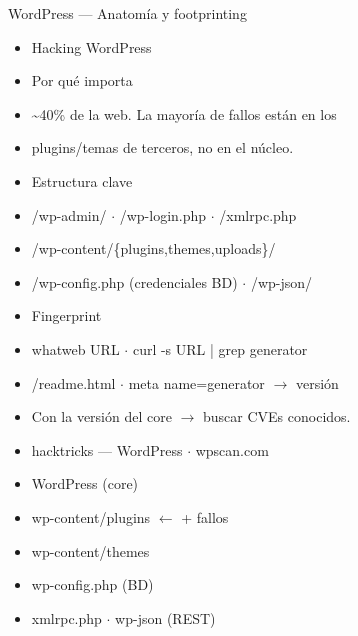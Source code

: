\documentclass[aspectratio=169,10pt]{beamer}
\begin{document}
\begin{frame}[allowframebreaks]{WordPress --- Anatomía y footprinting}
\small
  \begin{itemize}
  \item Hacking WordPress
  \item Por qué importa
  \item \textasciitilde{}40\% de la web. La mayoría de fallos están en los
  \item plugins/temas de terceros, no en el núcleo.
  \item Estructura clave
  \item /wp-admin/ $\cdot$ /wp-login.php $\cdot$ /xmlrpc.php
  \item /wp-content/\{plugins,themes,uploads\}/
  \item /wp-config.php (credenciales BD) $\cdot$ /wp-json/
  \item Fingerprint
  \item whatweb URL $\cdot$ curl -s URL | grep generator
  \item /readme.html $\cdot$ meta name=generator $\rightarrow$ versión
  \item Con la versión del core $\rightarrow$ buscar CVEs conocidos.
  \item hacktricks --- WordPress $\cdot$ wpscan.com
  \item WordPress (core)
  \item wp-content/plugins $\leftarrow$ + fallos
  \item wp-content/themes
  \item wp-config.php (BD)
  \item xmlrpc.php $\cdot$ wp-json (REST)
  \end{itemize}
\end{frame}
\end{document}
